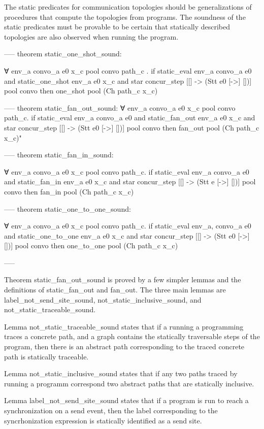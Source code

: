 \documentclass{article}
\begin{document}
The static predicates for communication topologies should be generalizations of procedures that
compute the topologies from programs.  The soundness of the static predicates must be provable
to be certain that statically described topologies are also observed when running the program.

-----
theorem static_one_shot_sound: 

∀ env_a convo_a e0 x_c pool convo path_c .
if
  static_eval env_a convo_a e0 and 
  static_one_shot env_a e0 x_c and 
  star concur_step [[] -> (Stt e0 [->] [])] {} pool convo
then
  one_shot pool (Ch path_c x_c)

-----
theorem static_fan_out_sound:
∀ env_a convo_a e0 x_c pool convo path_c. 
  if 
    static_eval env_a convo_a e0 and 
    static_fan_out env_a e0 x_c and 
    star concur_step [[] -> (Stt e0 [->] [])] {} pool convo
  then
    fan_out pool (Ch path_c x_c)" 

-----
theorem static_fan_in_sound:

∀ env_a convo_a e0 x_c pool convo path_c. 
  if
    static_eval env_a convo_a e0 and 
    static_fan_in env_a e0 x_c and 
    star concur_step [[] -> (Stt e [->] [])] {} pool convo
  then
    fan_in pool (Ch path_c x_c)

-----
theorem static_one_to_one_sound:

∀ env_a convo_a e0 x_c pool convo path_c. 
  if
    static_eval env_a, convo_a e0 and 
    static_one_to_one env_a e0 x_c and
    star concur_step [[] -> (Stt e0 [->] [])] {} pool convo
  then
    one_to_one pool (Ch path_c x_c)

-----

Theorem static_fan_out_sound is proved by a few simpler lemmas and the definitions
of static_fan_out and fan_out.  The three main lemmas are label_not_send_site_sound,
not_static_inclusive_sound, and not_static_traceable_sound.

Lemma not_static_traceable_sound states that if a running a programming traces a concrete
path, and a graph contains the statically traversable steps of the program, then there is an
abstract path corresponding to the traced concrete path is statically traceable.   

Lemma not_static_inclusive_sound states that if any two paths traced by running a programm
correspond two abstract paths that are statically inclusive.    

Lemma label_not_send_site_sound states that if a program is run to reach a synchronization on
a send event, then the label corresponding to the syncrhonization expression is statically
identified as a send site.
\end{document}
